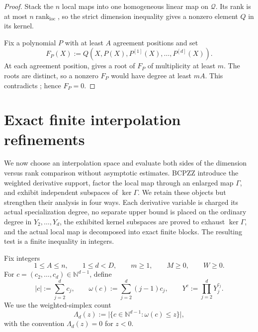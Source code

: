 \documentclass[11pt,letterpaper]{article}
\theoremstyle{definition}
\newcommand{\N}{\mathbb{N}}
\newcommand{\rank}{\operatorname{rank}}
\newcommand{\Qspace}{\mathcal{Q}}
\begin{document}
\begin{proof}
Stack the \(n\) local maps into one homogeneous linear map on \(\Qspace\).
Its rank is at most \(n\rank_{\mathrm{loc}}\), so the strict dimension
inequality gives a nonzero element \(Q\) in its kernel.

Fix a polynomial \(P\) with at least \(A\) agreement positions and set
\begin{equation}
  F_P(X):=Q(X,P(X),P^{[1]}(X),\ldots,P^{[d]}(X)).
  \label{eq:specialized-interpolant}
\end{equation}
At each agreement position,  gives a root of
\(F_P\) of multiplicity at least \(m\).  The roots are distinct, so a nonzero
\(F_P\) would have degree at least \(mA\).  This contradicts
; hence \(F_P=0\).
\end{proof}
  \section{Exact finite interpolation refinements}
\label{sec:exact-certificate}

We now choose an interpolation space and evaluate both sides of the dimension
versus rank comparison without asymptotic estimates. BCPZZ introduce the
weighted derivative support, factor the local map through an enlarged map
\(\Gamma\), and exhibit independent subspaces of \(\ker\Gamma\). We retain
these objects but strengthen their analysis in four ways. Each derivative
variable is charged its actual specialization degree, no separate upper bound is
placed on the ordinary degree in \(Y_2,\ldots,Y_d\), the exhibited kernel
subspaces are proved to exhaust \(\ker\Gamma\), and the actual local map is
decomposed into exact finite blocks. The resulting test is a finite inequality
in integers.

Fix integers
\begin{equation}
  1\leq A\leq n,
  \qquad
  1\leq d<D,
  \qquad
  m\geq 1,
  \qquad
  M\geq 0,
  \qquad
  W\geq 0.
  \label{eq:certificate-parameters}
\end{equation}
For \(c=(c_2,\ldots,c_d)\in\N^{d-1}\), define
\begin{equation}
  |c|:=\sum_{j=2}^{d}c_j,
  \qquad
  \omega(c):=\sum_{j=2}^{d}(j-1)c_j,
  \qquad
  Y^c:=\prod_{j=2}^{d}Y_j^{c_j}.
  \label{eq:omega-definition}
\end{equation}
We use the weighted-simplex count
\begin{equation}
  \Lambda_d(z)
  :=
  \bigl|
    \{c\in\N^{d-1}:\omega(c)\leq z\}
  \bigr|,
  \label{eq:lambda-definition}
\end{equation}
with the convention \(\Lambda_d(z)=0\) for \(z<0\).
\end{document}
